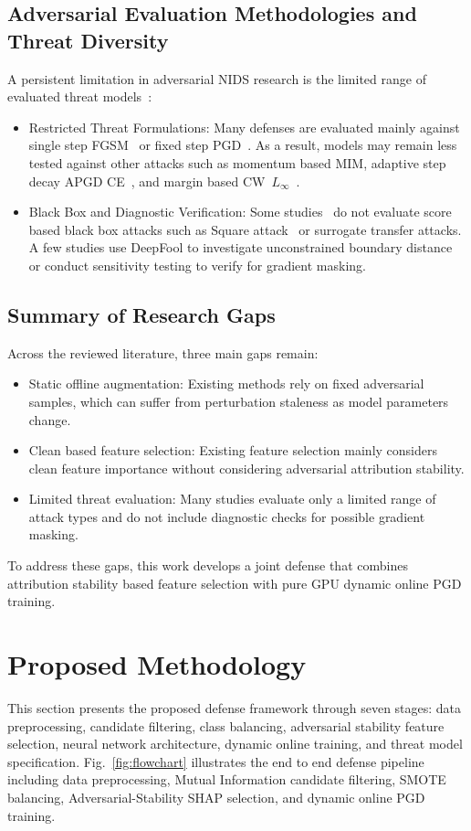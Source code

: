 \documentclass[conference]{IEEEtran}
\begin{document}
\subsection{Adversarial Evaluation Methodologies and Threat Diversity}
A persistent limitation in adversarial NIDS research is the limited range of evaluated threat models~\cite{ref14}:
\begin{itemize}
    \item Restricted Threat Formulations: Many defenses are evaluated mainly against single step FGSM~\cite{ref3} or fixed step PGD~\cite{ref5}. As a result, models may remain less tested against other attacks such as momentum based MIM, adaptive step decay APGD CE~\cite{ref7}, and margin based CW~$L_\infty$~\cite{ref8}.
    \item Black Box and Diagnostic Verification: Some studies~\cite{ref14} do not evaluate score based black box attacks such as Square attack~\cite{ref10} or surrogate transfer attacks. A few studies use DeepFool to investigate unconstrained boundary distance~\cite{ref9} or conduct sensitivity testing to verify for gradient masking.
\end{itemize}

\subsection{Summary of Research Gaps}
Across the reviewed literature, three main gaps remain:
\begin{itemize}
    \item Static offline augmentation: Existing methods rely on fixed adversarial samples, which can suffer from perturbation staleness as model parameters change.
    \item Clean based feature selection: Existing feature selection mainly considers clean feature importance without considering adversarial attribution stability.
    \item Limited threat evaluation: Many studies evaluate only a limited range of attack types and do not include diagnostic checks for possible gradient masking.
\end{itemize}
To address these gaps, this work develops a joint defense that combines attribution stability based feature selection with pure GPU dynamic online PGD training.

\section{Proposed Methodology}
This section presents the proposed defense framework through seven stages: data preprocessing, candidate filtering, class balancing, adversarial stability feature selection, neural network architecture, dynamic online training, and threat model specification. Fig.~\ref{fig:flowchart} illustrates the end to end defense pipeline including data preprocessing, Mutual Information candidate filtering, SMOTE balancing, Adversarial-Stability SHAP selection, and dynamic online PGD training.
\end{document}
